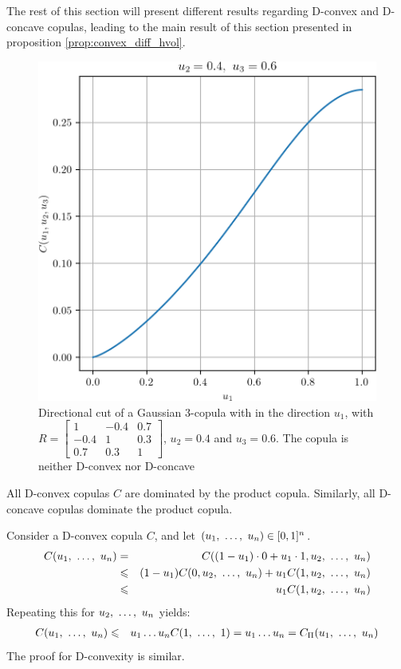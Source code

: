 The rest of this section will present different results regarding D-convex and D-concave copulas, leading to the main result of this section presented in proposition \ref{prop:convex_diff_hvol}.

\begin{figure}
    \centering
    \includegraphics[width=0.5\linewidth]{Images/Chap_2/Gaussian_copula/gaussian_copula_n3.png}
    \caption{Directional cut of a Gaussian 3-copula with in the direction $u_1$, with $R=\begin{bmatrix} 1 & -0.4 & 0.7\\ -0.4 & 1 & 0.3\\ 0.7 & 0.3 & 1 \end{bmatrix}$, $u_2=0.4$ and $u_3=0.6$. The copula is neither D-convex nor D-concave}
    \label{fig:gaussian_copula_simu_n3}
\end{figure}

\begin{remark}
    All D-convex copulas $C$ are dominated by the product copula. Similarly, all D-concave copulas dominate the product copula.

    Consider a D-convex copula $C$, and let $(u_1, ~\ldots, ~ u_n)\in[0,1]^n$.
    \begin{eqnarray*}
        C(u_1, ~\ldots, ~ u_n) &=& C((1-u_1)\cdot0+u_1\cdot 1, u_2, ~\ldots, ~ u_n)\\
        &\leqslant& (1-u_1)C(0, u_2, ~\ldots, ~ u_n)+u_1C(1, u_2, ~\ldots, ~ u_n)\\
        &\leqslant& u_1C(1, u_2, ~\ldots, ~ u_n)
    \end{eqnarray*}
    Repeating this for $u_2, ~\ldots, ~ u_n$ yields:
    \begin{eqnarray*}
        C(u_1, ~\ldots, ~ u_n) &\leqslant& u_1\dots u_nC(1, ~\ldots, ~1) = u_1\dots u_n = C_\Pi(u_1, ~\ldots, ~ u_n)
    \end{eqnarray*}
    The proof for D-convexity is similar.
\end{remark}

